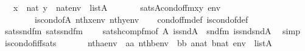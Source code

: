 \begin{isabellebody}
\ \ {\isachardoublequoteopen}{\isasymlbrakk}\ x\ {\isasymin}\ nat{\isacharsemicolon}{\kern0pt}\ y\ {\isasymin}\ nat{\isacharsemicolon}{\kern0pt}env\ {\isasymin}\ list{\isacharparenleft}{\kern0pt}A{\isacharparenright}{\kern0pt}\ {\isasymrbrakk}\ \isanewline
\ \ \ \ {\isasymLongrightarrow}\ sats{\isacharparenleft}{\kern0pt}A{\isacharcomma}{\kern0pt}cond{\isacharunderscore}{\kern0pt}of{\isacharunderscore}{\kern0pt}fm{\isacharparenleft}{\kern0pt}x{\isacharcomma}{\kern0pt}y{\isacharparenright}{\kern0pt}{\isacharcomma}{\kern0pt}\ env{\isacharparenright}{\kern0pt}\ {\isasymlongleftrightarrow}\isanewline
\ \ \ \ \ \ \ \ is{\isacharunderscore}{\kern0pt}cond{\isacharunderscore}{\kern0pt}of{\isacharparenleft}{\kern0pt}{\isacharhash}{\kern0pt}{\isacharhash}{\kern0pt}A{\isacharcomma}{\kern0pt}\ nth{\isacharparenleft}{\kern0pt}x{\isacharcomma}{\kern0pt}env{\isacharparenright}{\kern0pt}{\isacharcomma}{\kern0pt}\ nth{\isacharparenleft}{\kern0pt}y{\isacharcomma}{\kern0pt}env{\isacharparenright}{\kern0pt}{\isacharparenright}{\kern0pt}{\isachardoublequoteclose}\isanewline
%
\isadelimproof
\ \ %
\endisadelimproof
%
\isatagproof
{}\isamarkupfalse%
\ cond{\isacharunderscore}{\kern0pt}of{\isacharunderscore}{\kern0pt}fm{\isacharunderscore}{\kern0pt}def\ is{\isacharunderscore}{\kern0pt}cond{\isacharunderscore}{\kern0pt}of{\isacharunderscore}{\kern0pt}def\ \isamarkupfalse%
\ sats{\isacharunderscore}{\kern0pt}snd{\isacharunderscore}{\kern0pt}fm\ sats{\isacharunderscore}{\kern0pt}snd{}{\isacharunderscore}{\kern0pt}fm\isanewline
\ \ \ \ sats{\isacharunderscore}{\kern0pt}hcomp{\isacharunderscore}{\kern0pt}fm{\isacharbrackleft}{\kern0pt}of\ A\ {\isachardoublequoteopen}is{\isacharunderscore}{\kern0pt}snd{\isacharparenleft}{\kern0pt}{\isacharhash}{\kern0pt}{\isacharhash}{\kern0pt}A{\isacharparenright}{\kern0pt}{\isachardoublequoteclose}\ {\isacharunderscore}{\kern0pt}\ snd{\isacharunderscore}{\kern0pt}fm\ {\isachardoublequoteopen}is{\isacharunderscore}{\kern0pt}snd{\isacharunderscore}{\kern0pt}snd{\isacharparenleft}{\kern0pt}{\isacharhash}{\kern0pt}{\isacharhash}{\kern0pt}A{\isacharparenright}{\kern0pt}{\isachardoublequoteclose}{\isacharbrackright}{\kern0pt}\ \isamarkupfalse%
\ simp%
\endisatagproof
{\isafoldproof}%
%
\isadelimproof
\isanewline
%
\endisadelimproof
\isanewline
{}\isamarkupfalse%
\ is{\isacharunderscore}{\kern0pt}cond{\isacharunderscore}{\kern0pt}of{\isacharunderscore}{\kern0pt}iff{\isacharunderscore}{\kern0pt}sats{\isacharcolon}{\kern0pt}\isanewline
\ \ \isanewline
\ \ \ \ {\isachardoublequoteopen}nth{\isacharparenleft}{\kern0pt}a{\isacharcomma}{\kern0pt}env{\isacharparenright}{\kern0pt}\ {\isacharequal}{\kern0pt}\ aa{\isachardoublequoteclose}\ {\isachardoublequoteopen}nth{\isacharparenleft}{\kern0pt}b{\isacharcomma}{\kern0pt}env{\isacharparenright}{\kern0pt}\ {\isacharequal}{\kern0pt}\ bb{\isachardoublequoteclose}\ {\isachardoublequoteopen}a{\isasymin}nat{\isachardoublequoteclose}\ {\isachardoublequoteopen}b{\isasymin}nat{\isachardoublequoteclose}\ {\isachardoublequoteopen}env\ {\isasymin}\ list{\isacharparenleft}{\kern0pt}A{\isacharparenright}{\kern0pt}{\isachardoublequoteclose}\isanewline

\end{isabellebody}
